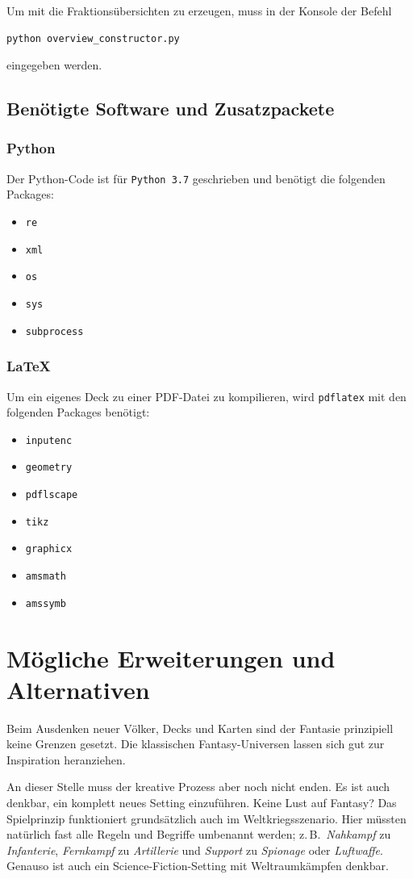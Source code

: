 \documentclass[a4paper,11pt]{report}
\begin{document}
Um mit die Fraktionsübersichten zu erzeugen, muss in der Konsole der Befehl
\begin{lstlisting}
python overview_constructor.py
\end{lstlisting}
eingegeben werden.

\section{Benötigte Software und Zusatzpackete}
\subsection{Python}
Der Python-Code ist für \verb+Python 3.7+ geschrieben und benötigt die folgenden Packages:
\begin{itemize}
	\item \verb+re+
	\item \verb+xml+
	\item \verb+os+
	\item \verb+sys+
	\item \verb+subprocess+
\end{itemize}

\subsection{\LaTeX}
Um ein eigenes Deck zu einer PDF-Datei zu kompilieren, wird \verb+pdflatex+ mit den folgenden Packages benötigt:
\begin{itemize}
	\item \verb+inputenc+
	\item \verb+geometry+
	\item \verb+pdflscape+
	\item \verb+tikz+
	\item \verb+graphicx+
	\item \verb+amsmath+
	\item \verb+amssymb+
\end{itemize}

\chapter{Mögliche Erweiterungen und Alternativen}
Beim Ausdenken neuer Völker, Decks und Karten sind der Fantasie prinzipiell keine Grenzen gesetzt. Die klassischen Fantasy-Universen lassen sich gut zur Inspiration heranziehen.

An dieser Stelle muss der kreative Prozess aber noch nicht enden. Es ist auch denkbar, ein komplett neues Setting einzuführen. Keine Lust auf Fantasy? Das Spielprinzip funktioniert grundsätzlich auch im Weltkriegsszenario. Hier müssten natürlich fast alle Regeln und Begriffe umbenannt werden; z.\,B.\ \emph{Nahkampf} zu \emph{Infanterie}, \emph{Fernkampf} zu \emph{Artillerie} und \emph{Support} zu \emph{Spionage} oder \emph{Luftwaffe}. Genauso ist auch ein Science-Fiction-Setting mit Weltraumkämpfen denkbar.
\end{document}
